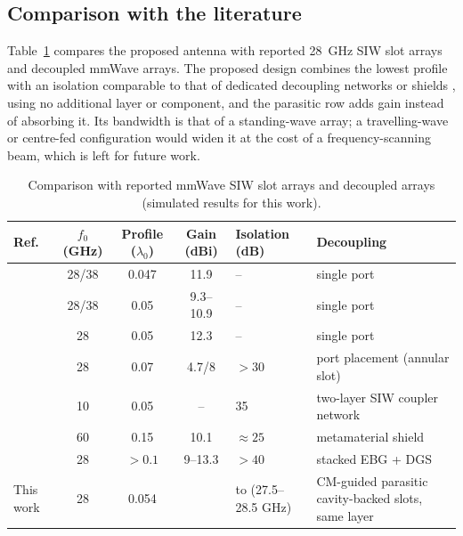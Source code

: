 \documentclass[preprint,12pt]{elsarticle}
\begin{document}
\subsection{Comparison with the literature}
Table~\ref{tab:comp} compares the proposed antenna with reported 28~GHz SIW slot arrays and decoupled mmWave arrays. The proposed design combines the lowest profile with an isolation comparable to that of dedicated decoupling networks \cite{diman2021} or shields \cite{alibakhshikenari2019,dey2021}, using no additional layer or component, and the parasitic row adds gain instead of absorbing it. Its bandwidth is that of a standing-wave array; a travelling-wave or centre-fed configuration would widen it at the cost of a frequency-scanning beam, which is left for future work.

\begin{table}[t]\centering\caption{Comparison with reported mmWave SIW slot arrays and decoupled arrays (simulated results for this work).}\label{tab:comp}
\footnotesize\begin{tabular}{@{}lcccp{2.0cm}p{3.2cm}@{}}\toprule
Ref. & $f_0$ (GHz) & Profile ($\lambda_0$) & Gain (dBi) & Isolation (dB) & Decoupling \\\midrule
\cite{ashraf2015} & 28/38 & 0.047 & 11.9 & -- & single port\\
\cite{lai2020} & 28/38 & 0.05 & 9.3--10.9 & -- & single port\\
\cite{singh2021} & 28 & 0.05 & 12.3 & -- & single port\\
\cite{kobal2022} & 28 & 0.07 & 4.7/8 & $>30$ & port placement (annular slot)\\
\cite{diman2021} & 10 & 0.05 & -- & 35 & two-layer SIW coupler network\\
\cite{alibakhshikenari2019} & 60 & 0.15 & 10.1 & $\approx 25$ & metamaterial shield\\
\cite{dey2021} & 28 & $>0.1$ & 9--13.3 & $>40$ & stacked EBG + DGS\\
This work & 28 & 0.054 & \GainDec{} & \IsoDecMin{} to \IsoDecMax{} (27.5--28.5 GHz) & CM-guided parasitic cavity-backed slots, same layer\\
\bottomrule\end{tabular}\end{table}
\end{document}
